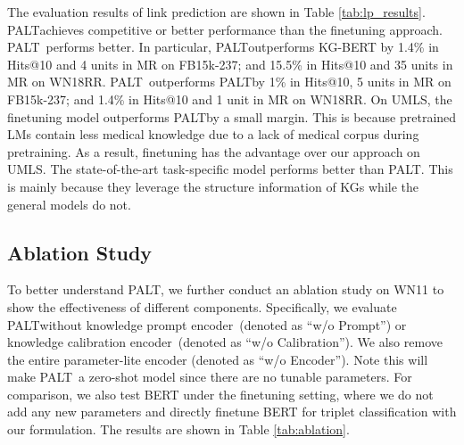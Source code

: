 \documentclass[11pt]{article}
\newcommand{\method}{\textsc{PALT}}
\newcommand{\methodLarge}{\method}
\newcommand{\prompt}{knowledge prompt encoder}
\newcommand{\calibration}{knowledge calibration encoder}
\begin{document}
%
 
The evaluation results of link prediction are shown in Table \ref{tab:lp_results}. \method  achieves competitive or better performance than the finetuning approach. \methodLarge\ performs better. In particular, \method  outperforms KG-BERT by 1.4\% in Hits@10 and 4 units in MR on FB15k-237; and 15.5\% in Hits@10 and 35 units in MR on WN18RR. \methodLarge\ outperforms \method  by 1\% in Hits@10, 5 units in MR on FB15k-237; and 1.4\% in Hits@10 and 1 unit in MR on WN18RR. On UMLS, the finetuning model outperforms \method  by a small margin. This is because pretrained LMs contain less medical knowledge due to a lack of medical corpus during pretraining. As a result, finetuning has the advantage over our approach on UMLS. The state-of-the-art task-specific model performs better than \method. This is mainly because they leverage the structure information of KGs while the general models do not.

\subsection{Ablation Study}
To better understand \method, we further conduct an ablation study on WN11 to show the effectiveness of different components. Specifically, we evaluate \method  without \prompt\ (denoted as ``w/o Prompt'') or \calibration\ (denoted as ``w/o Calibration''). We also remove the entire parameter-lite encoder (denoted as ``w/o Encoder''). Note this will make \method\ a zero-shot model since there are no tunable parameters. For comparison, we also test BERT under the finetuning setting, where we do not add any new parameters and directly finetune BERT for triplet classification with our formulation. The results are shown in Table \ref{tab:ablation}.
\end{document}
